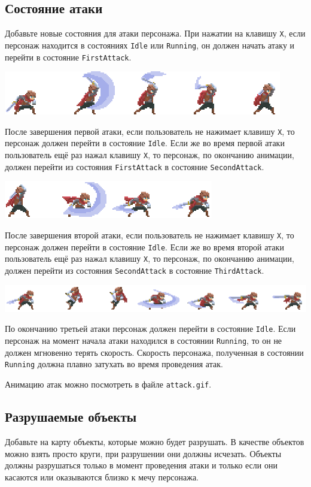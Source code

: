 \documentclass{article}
\begin{document}
\subsection*{Состояние атаки}
Добавьте новые состояния для атаки персонажа. При нажатии на клавишу \texttt{X}, если персонаж находится в состояниях \texttt{Idle} или \texttt{Running}, он должен начать атаку и перейти в состояние \texttt{FirstAttack}.

\begin{center}
\includegraphics[scale=0.7]{../images/hero_texture_attack.png}
\end{center}

После завершения первой атаки, если пользователь не нажимает клавишу \texttt{X}, то персонаж должен перейти в состояние \texttt{Idle}. Если же во время первой атаки пользователь ещё раз нажал клавишу \texttt{X}, то персонаж, по окончанию анимации, должен перейти из состояния \texttt{FirstAttack} в состояние \texttt{SecondAttack}.
\begin{center}
\includegraphics[scale=0.7]{../images/hero_texture_attack2.png}
\end{center}

После завершения второй атаки, если пользователь не нажимает клавишу \texttt{X}, то персонаж должен перейти в состояние \texttt{Idle}. Если же во время второй атаки пользователь ещё раз нажал клавишу \texttt{X}, то персонаж, по окончанию анимации, должен перейти из состояния \texttt{SecondAttack} в состояние \texttt{ThirdAttack}.
\begin{center}
\includegraphics[scale=0.7]{../images/hero_texture_attack3.png}
\end{center}

По окончанию третьей атаки персонаж должен перейти в состояние \texttt{Idle}. Если персонаж на момент начала атаки находился в состоянии \texttt{Running}, то он не должен мгновенно терять скорость. Скорость персонажа, полученная в состоянии \texttt{Running} должна плавно затухать во время проведения атак. 

Анимацию атак можно посмотреть в файле \texttt{attack.gif}.


\subsection*{Разрушаемые объекты}
Добавьте на карту объекты, которые можно будет разрушать. В качестве объектов можно взять просто круги, при разрушении они должны исчезать. Объекты должны разрушаться только в момент проведения атаки и только если они касаются или оказываются близко к мечу персонажа.
\end{document}
